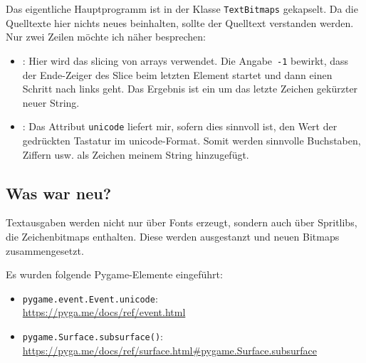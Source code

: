 

Das eigentliche Hauptprogramm ist in der Klasse \texttt{TextBitmaps} gekapselt. Da die Quelltexte hier nichts neues beinhalten, sollte der Quelltext verstanden werden. Nur zwei Zeilen möchte ich näher besprechen:

\begin{itemize}
    \item {}: Hier wird das \gls{slicing} von \glspl{array} verwendet. Die Angabe~\texttt{-1} bewirkt, dass der Ende-Zeiger des Slice beim letzten Element startet und dann einen Schritt nach links geht. Das Ergebnis ist ein um das letzte Zeichen gekürzter neuer String.

    \item {}: Das Attribut \texttt{unicode} liefert mir, sofern dies sinnvoll ist, den Wert der gedrückten Tastatur im \gls{unicode}-Format. Somit werden sinnvolle Buchstaben, Ziffern usw. als Zeichen meinem String hinzugefügt.
\end{itemize}





\subsection*{Was war neu?}

Textausgaben werden nicht nur über Fonts erzeugt, sondern auch über Spritlibs, die Zeichenbitmaps enthalten. Diese werden ausgestanzt und neuen Bitmaps zusammengesetzt.

Es wurden folgende Pygame-Elemente eingeführt:

\begin{itemize}
	\item \texttt{pygame.event.Event.unicode}:
	\\ \url{https://pyga.me/docs/ref/event.html}

	\item \texttt{pygame.Surface.subsurface()}:
	\\ \url{https://pyga.me/docs/ref/surface.html#pygame.Surface.subsurface}
	
\end{itemize}
